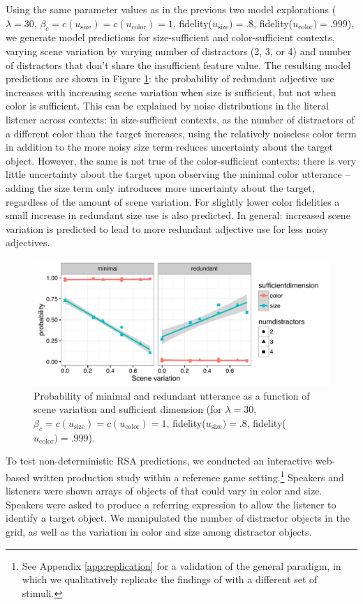\documentclass[11pt]{article}
\newcommand{\figref}[1]{Figure \ref{#1}}
\newcommand{\appref}[1]{Appendix \ref{#1}}
\begin{document}
Using the same parameter values as in the previous two model explorations ($\lambda = 30$, $ \beta_c = c(u_{\textrm{size}}) = c(u_{\textrm{color}}) = 1$, fidelity($u_{\textrm{size}}) = .8$, fidelity($u_{\textrm{color}}) = .999$), we generate model predictions for size-sufficient and color-sufficient contexts, varying scene variation by varying number of distractors (2, 3, or 4) and number of distractors that don't share the insufficient feature value. The resulting model predictions are shown in \figref{fig:numdistractors}: the probability of redundant adjective use increases with increasing scene variation when size is sufficient, but not when color is sufficient. This can be explained by noise distributions in the literal listener across contexts: in size-sufficient contexts, as the number of distractors of a different color than the target increases, using the relatively noiseless color term in addition to the more noisy size term reduces uncertainty about the target object. However, the same is not true of the color-sufficient contexts: there is very little uncertainty about the target upon observing the minimal color utterance -- adding the size term only introduces more uncertainty about the target, regardless of the amount of scene variation. For slightly lower color fidelities a small increase in redundant size use is also predicted. In general: increased scene variation is predicted to lead to more redundant adjective use for less noisy adjectives.

\begin{figure}
\centering
\includegraphics[width=.9\textwidth]{pics/scenevariation-effect}
\caption{Probability of minimal and redundant utterance as a function of scene variation and sufficient dimension (for $\lambda = 30$, $ \beta_c = c(u_{\textrm{size}}) = c(u_{\textrm{color}}) = 1$, fidelity($u_{\textrm{size}}) = .8$, fidelity($u_{\textrm{color}}) = .999$).}
\label{fig:numdistractors}
\end{figure}


To test non-deterministic RSA predictions, we conducted an interactive web-based written production study within a reference game setting.\footnote{See \appref{app:replication}  for a validation of the general paradigm, in which we qualitatively replicate the findings of  with a different set of stimuli.} Speakers and listeners were shown arrays of objects of that could vary in color and size. Speakers were asked to produce a referring expression to allow the listener to identify a target object. We manipulated the number of distractor objects in the grid, as well as the variation in color and size among distractor objects.
\end{document}
